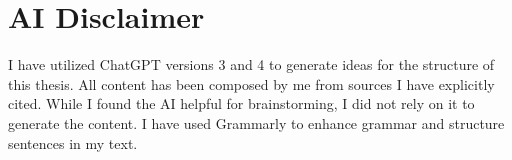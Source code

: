 \section{AI Disclaimer} \label{sec:AI}
I have utilized ChatGPT versions 3 and 4 to generate ideas for the structure of this thesis. All content has been composed by me from sources I have explicitly cited. While I found the AI helpful for brainstorming, I did not rely on it to generate the content. I have used Grammarly to enhance grammar and structure sentences in my text.
